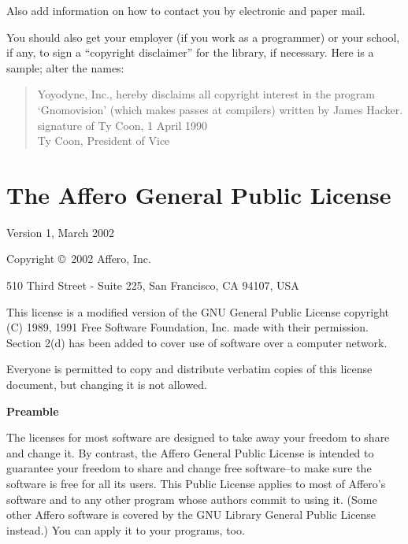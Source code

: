 \documentclass[11pt, letterpaper]{book}
\begin{document}
Also add information on how to contact you by electronic and paper mail.

You should also get your employer (if you work as a programmer) or your
school, if any, to sign a ``copyright disclaimer'' for the library, if
necessary. Here is a sample; alter the names:

\begin{quote}
Yoyodyne, Inc., hereby disclaims all copyright interest in the program \\
`Gnomovision' (which makes passes at compilers) written by James Hacker. \\

signature of Ty Coon, 1 April 1990 \\
Ty Coon, President of Vice
\end{quote}


\chapter{The Affero General Public License}

\begin{center}
{\parindent 0in

Version 1, March 2002

Copyright \copyright\ 2002 Affero, Inc.

\bigskip

510 Third Street - Suite 225, San Francisco, CA 94107, USA

\bigskip

This license is a modified version of the GNU General Public License
copyright (C) 1989, 1991 Free Software Foundation, Inc. made with
their permission. Section 2(d) has been added to cover use of software
over a computer network.

Everyone is permitted to copy and distribute verbatim copies
of this license document, but changing it is not allowed.
}
\end{center}

\begin{center}
{\bf\large Preamble}
\end{center}



The licenses for most software are designed to take away your freedom
to share and change it. By contrast, the Affero General Public License
is intended to guarantee your freedom to share and change free
software--to make sure the software is free for all its users. This
Public License applies to most of Affero's software and to any other
program whose authors commit to using it. (Some other Affero software
is covered by the GNU Library General Public License instead.) You can
apply it to your programs, too.
\end{document}
